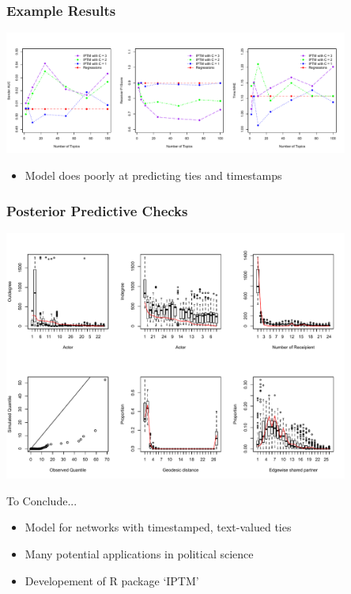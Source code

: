 \documentclass[10pt, xcolor=table]{beamer}
\def\bni{\begin{itemize}} \def\ei{\end{itemize}}
\theoremstyle{definition}
\theoremstyle{remark}
\begin{document}
\begin{frame} \frametitle{Example Results}
\begin{center}
	\includegraphics[width=0.85\textwidth]{figures/Dare_PPE_22.pdf}
	\end{center}
\begin{itemize}
	\item Model does poorly at predicting ties and timestamps
\end{itemize}
\end{frame}

\begin{frame} \frametitle{Posterior Predictive Checks}
\begin{center}
	\includegraphics[width=0.85\textwidth]{figures/PPC_Dare_80.pdf}
	\end{center}
\end{frame}


\begin{frame}{To Conclude...}
  \large
 \bni
 \item Model for networks with timestamped, text-valued ties
 	\vspace{0.4cm}
 \item Many potential applications in political science
 	\vspace{0.4cm}
 	\item Developement of R package `IPTM'
 \ei
\end{frame}
\end{document}
